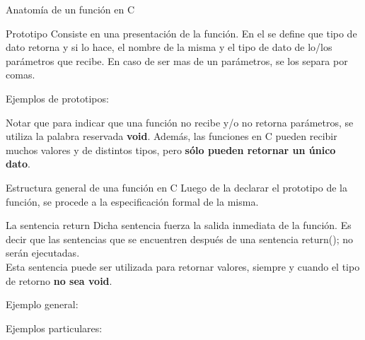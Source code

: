 \documentclass[xcolor=pdftex,table,11pt]{beamer}
\begin{document}
\begin{frame}[allowframebreaks]{Anatomía de un función en C}

\begin{block}{Prototipo}
Consiste en una presentación de la función. En el se define que tipo de dato retorna y si lo hace, el nombre de la misma y el tipo de dato de lo/los parámetros que recibe. En caso de ser mas de un parámetros, se los separa por comas.\\
\end{block}

Ejemplos de prototipos:
\codesetstylefrombeamer
{}


Notar que para indicar que una función no recibe y/o no retorna parámetros, se utiliza la palabra reservada \textbf{void}. Además, las funciones en C pueden recibir muchos valores y de distintos tipos, pero \textbf{sólo pueden retornar un único dato}.

\newpage

\begin{block}{Estructura general de una función en C}
Luego de la declarar el prototipo de la función, se procede a la especificación formal de la misma.
\end{block}

\begin{block}{La sentencia return}
Dicha sentencia fuerza la salida inmediata de la función. Es decir que las sentencias que se encuentren después de una sentencia return(); no serán ejecutadas.\\
Esta sentencia puede ser utilizada para retornar valores, siempre y cuando el tipo de retorno \textbf{no sea void}. 
\end{block}


Ejemplo general:
\codesetstylefrombeamer
{}

Ejemplos particulares:







\end{frame}
\end{document}

